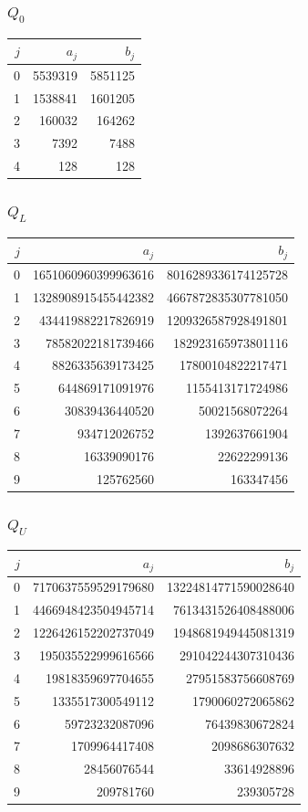 \documentclass[11pt,a4paper]{article}
\begin{document}
\subsubsection*{$Q_0$}
{\small
\begin{longtable}{rrr}
\toprule
$j$ & $a_j$ & $b_j$\\\midrule
\endhead
0 & 5539319 & 5851125\\
1 & 1538841 & 1601205\\
2 & 160032 & 164262\\
3 & 7392 & 7488\\
4 & 128 & 128\\
\bottomrule
\end{longtable}
}

\subsubsection*{$Q_L$}
{\small
\begin{longtable}{rrr}
\toprule
$j$ & $a_j$ & $b_j$\\\midrule
\endhead
0 & 1651060960399963616 & 8016289336174125728\\
1 & 1328908915455442382 & 4667872835307781050\\
2 & 434419882217826919 & 1209326587928491801\\
3 & 78582022181739466 & 182923165973801116\\
4 & 8826335639173425 & 17800104822217471\\
5 & 644869171091976 & 1155413171724986\\
6 & 30839436440520 & 50021568072264\\
7 & 934712026752 & 1392637661904\\
8 & 16339090176 & 22622299136\\
9 & 125762560 & 163347456\\
\bottomrule
\end{longtable}
}

\subsubsection*{$Q_U$}
{\small
\begin{longtable}{rrr}
\toprule
$j$ & $a_j$ & $b_j$\\\midrule
\endhead
0 & 7170637559529179680 & 13224814771590028640\\
1 & 4466948423504945714 & 7613431526408488006\\
2 & 1226426152202737049 & 1948681949445081319\\
3 & 195035522999616566 & 291042244307310436\\
4 & 19818359697704655 & 27951583756608769\\
5 & 1335517300549112 & 1790060272065862\\
6 & 59723232087096 & 76439830672824\\
7 & 1709964417408 & 2098686307632\\
8 & 28456076544 & 33614928896\\
9 & 209781760 & 239305728\\
\bottomrule
\end{longtable}
}
\end{document}
